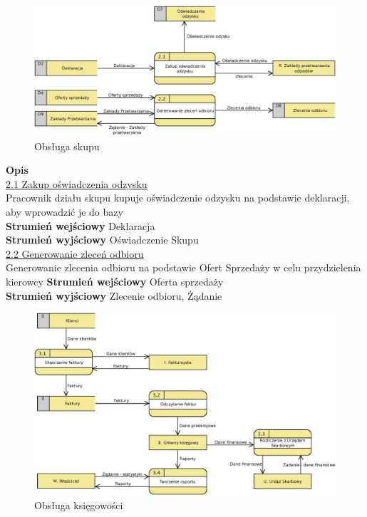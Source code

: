 	\begin{figure}[H]
		\centering
		\centerline{\includegraphics[width=1.1\textwidth]{img/DFD/2-level-skup.eps}}
		\caption{Obsługa skupu}
	\end{figure}
	
	\textbf{Opis} \\
	\underline{2.1 Zakup oświadczenia odzysku}\\
	Pracownik działu skupu kupuje oświadczenie odzysku na podstawie deklaracji, aby wprowadzić je do bazy \\
	\textbf{Strumień wejściowy} Deklaracja \\
	\textbf{Strumień wyjściowy} Oświadczenie Skupu \\
	
	\underline{2.2 Generowanie zleceń odbioru}\\
	Generowanie zlecenia odbioru na podstawie Ofert Sprzedaży w celu przydzielenia kierowcy
	\textbf{Strumień wejściowy} Oferta sprzedaży \\
	\textbf{Strumień wyjściowy} Zlecenie odbioru, Żądanie \\
	
	\begin{figure}[H]
		\centering
		\centerline{\includegraphics[width=1.1\textwidth]{img/DFD/2-level-ksiegowosc.eps}}
		\caption{Obsługa księgowości}
	\end{figure}

